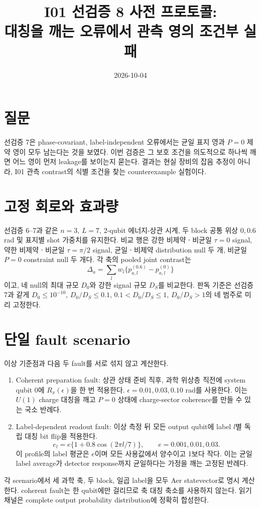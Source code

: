 \documentclass[11pt]{article}
\begin{document}
\title{I01 선검증 8 사전 프로토콜:\\
대칭을 깨는 오류에서 관측 영의 조건부 실패}
\date{2026-10-04}
\maketitle

\section*{질문}
선검증 7은 phase-covariant, label-independent 오류에서는 균일 표지 영과
$P=0$ 제약 영이 모두 남는다는 것을 보였다. 이번 검증은 그 보호 조건을
의도적으로 하나씩 깨면 어느 영이 먼저 leakage를 보이는지 묻는다. 결과는
현실 장비의 잡음 추정이 아니라, I01 관측 contrast의 식별 조건을 찾는
counterexample 실험이다.

\section*{고정 회로와 효과량}
선검증 6--7과 같은 $n=3$, $L=7$, 2-qubit 에너지-상관 시계, 두 block 공통 위상
$0,0.6$ rad 및 표지별 shot 가중치를 유지한다. 비교 행은 강한 비제약ㆍ비균일
$\tau=0$ signal, 약한 비제약ㆍ비균일 $\tau=\pi/2$ signal, 균일ㆍ비제약
distribution null 두 개, 비균일 $P=0$ constraint null 두 개다. 각 축의
pooled joint contrast는
\[
 \Delta_a=\sum_lw_l\{p_{a,l}^{(0.6)}-p_{a,l}^{(0)}\}
\]
이고, 네 null의 최대 규모 $D_0$와 강한 signal 규모 $D_S$를 비교한다.
판독 기준은 선검증 7과 같게 $D_0\le10^{-10}$, $D_0/D_S\le0.1$,
$0.1<D_0/D_S\le1$, $D_0/D_S>1$의 네 범주로 미리 고정한다.

\section*{단일 fault scenario}
이상 기준점과 다음 두 fault를 서로 섞지 않고 계산한다.
\begin{enumerate}
\item Coherent preparation fault: 상관 상태 준비 직후, 과학 위상층 직전에
  system qubit 0에 $R_x(\epsilon)$을 한 번 적용한다.
  $\epsilon=0.01,0.03,0.10$ rad를 사용한다. 이는 $U(1)$ charge 대칭을 깨고
  $P=0$ 상태에 charge-sector coherence를 만들 수 있는 국소 반례다.
\item Label-dependent readout fault: 이상 측정 뒤 모든 output qubit에
  label $l$별 독립 대칭 bit flip을 적용한다.
  \[
   e_l=e\{1+0.8\cos(2\pi l/7)\},\qquad
   e=0.001,0.01,0.03.
  \]
  이 profile의 label 평균은 $e$이며 모든 사용값에서 양수이고 1보다 작다.
  이는 균일 label average가 detector response까지 균일하다는 가정을 깨는
  고정된 반례다.
\end{enumerate}
각 scenario에서 세 과학 축, 두 block, 일곱 label을 모두 Aer statevector로
명시 계산한다. coherent fault는 한 qubit에만 걸리므로 축 대칭 축소를 사용하지
않는다. 읽기 채널은 complete output probability distribution에 정확히 합성한다.
\end{document}
